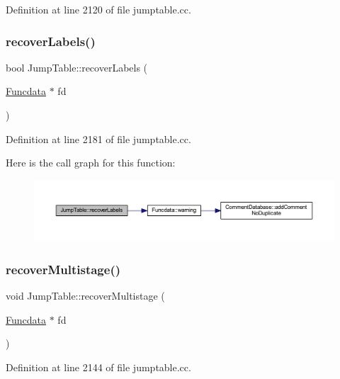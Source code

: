 Definition at line 2120 of file jumptable.\+cc.

\mbox{\label{class_jump_table_aa104a5da577eb8a1a5ab9aa30bbc7210}} 
\subsubsection{\texorpdfstring{recoverLabels()}{recoverLabels()}}
{\footnotesize\ttfamily bool Jump\+Table\+::recover\+Labels (\begin{DoxyParamCaption}\item[{\mbox{\hyperlink{class_funcdata}{Funcdata}} $\ast$}]{fd }\end{DoxyParamCaption})}



Definition at line 2181 of file jumptable.\+cc.

Here is the call graph for this function\+:
\nopagebreak
\begin{figure}[H]
\begin{center}
\leavevmode
\includegraphics[width=350pt]{class_jump_table_aa104a5da577eb8a1a5ab9aa30bbc7210_cgraph}
\end{center}
\end{figure}
\mbox{\label{class_jump_table_afba6e59f39d15b0f5b231ef9d849625e}} 
\subsubsection{\texorpdfstring{recoverMultistage()}{recoverMultistage()}}
{\footnotesize\ttfamily void Jump\+Table\+::recover\+Multistage (\begin{DoxyParamCaption}\item[{\mbox{\hyperlink{class_funcdata}{Funcdata}} $\ast$}]{fd }\end{DoxyParamCaption})}



Definition at line 2144 of file jumptable.\+cc.


